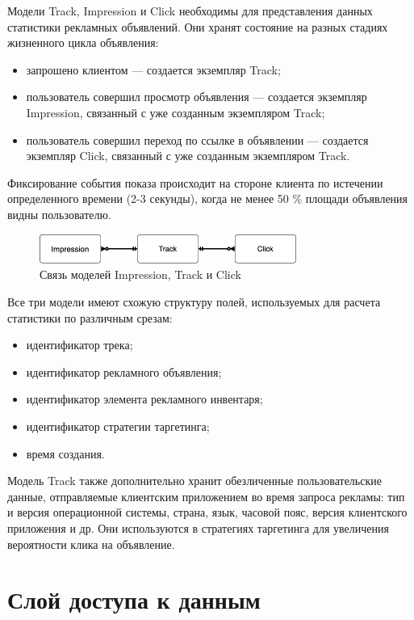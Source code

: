 \documentclass[specification,annotation,times]{itmo-student-thesis}
\begin{document}
Модели Track, Impression и Click необходимы для представления данных статистики рекламных объявлений. Они хранят состояние на разных стадиях жизненного цикла объявления: 
\begin{itemize}
\item запрошено клиентом — создается экземпляр Track;
\item пользователь совершил просмотр объявления — создается экземпляр Impression, связанный с уже созданным экземпляром Track;
\item пользователь совершил переход по ссылке в объявлении — создается экземпляр Click, связанный с уже созданным экземпляром Track.
\end{itemize}

Фиксирование события показа происходит на стороне клиента по истечении определенного времени (2-3 секунды), когда не менее 50 \% площади объявления видны пользователю.


\begin{figure}[h]
\caption{Связь моделей Impression, Track и Click}
\includegraphics[width=0.75\textwidth]{track-impression-click}
\centering
\end{figure}

Все три модели имеют схожую структуру полей, используемых для расчета статистики по различным срезам:
\begin{itemize}
\item идентификатор трека;
\item идентификатор рекламного объявления;
\item идентификатор элемента рекламного инвентаря;
\item идентификатор стратегии таргетинга;
\item время создания.
\end{itemize}

Модель Track также дополнительно хранит обезличенные пользовательские данные, отправляемые клиентским приложением во время запроса рекламы: тип и версия операционной системы, страна, язык, часовой пояс, версия клиентского приложения и др. Они используются в стратегиях таргетинга для увеличения вероятности клика на объявление.



\section{Слой доступа к данным}\label{sec:data-access-layer}
\end{document}
